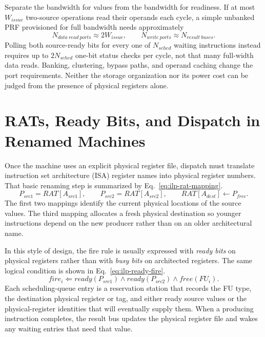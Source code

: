 Separate the bandwidth for values from the bandwidth for readiness.
If at most $W_{issue}$ two-source operations read their operands each cycle, a simple unbanked PRF provisioned for full bandwidth needs approximately
\begin{equation}\label{eq:ilp-prf-port-estimate}
    N_{data\ read\ ports}\approx 2W_{issue},\qquad
    N_{write\ ports}\approx N_{result\ buses}.
\end{equation}
Polling both source-ready bits for every one of $N_{sched}$ waiting instructions instead requires up to $2N_{sched}$ one-bit status checks per cycle, not that many full-width data reads.
Banking, clustering, bypass paths, and operand caching change the port requirements.
Neither the storage organization nor its power cost can be judged from the presence of physical registers alone.


\section{RATs, Ready Bits, and Dispatch in Renamed Machines}\label{sec:ilp-rat-ready}
Once the machine uses an explicit physical register file, dispatch must translate instruction set architecture (ISA) register names into physical register numbers.
That basic renaming step is summarized by Eq.~\eqref{eq:ilp-rat-mapping}.
\begin{equation}\label{eq:ilp-rat-mapping}
    P_{src1}=RAT[A_{src1}],\qquad
    P_{src2}=RAT[A_{src2}],\qquad
    RAT[A_{dest}]\leftarrow P_{free}.
\end{equation}
The first two mappings identify the current physical locations of the source values.
The third mapping allocates a fresh physical destination so younger instructions depend on the new producer rather than on an older architectural name.

In this style of design, the fire rule is usually expressed with \textit{ready bits} on physical registers rather than with \textit{busy bits} on architected registers.
The same logical condition is shown in Eq.~\eqref{eq:ilp-ready-fire}.
\begin{equation}\label{eq:ilp-ready-fire}
    fire_i \Leftarrow ready(P_{src1})\wedge ready(P_{src2})\wedge free(FU_i).
\end{equation}
Each scheduling-queue entry is a reservation station that records the FU type, the destination physical register or tag, and either ready source values or the physical-register identities that will eventually supply them.
When a producing instruction completes, the result bus updates the physical register file and wakes any waiting entries that need that value.

